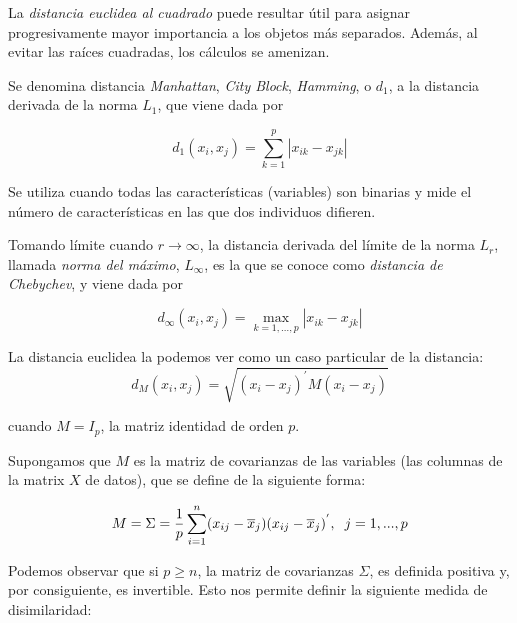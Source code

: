\begin{observacion}
La \textit{distancia euclidea al cuadrado} puede resultar útil para asignar progresivamente mayor importancia a los objetos más separados. Además, al evitar las
raíces cuadradas, los cálculos se amenizan.
\end{observacion}


\begin{definicion}

    Se denomina distancia \textit{Manhattan}, \textit{City Block}, \textit{Hamming}, o \textit{$d_{1}$}, a la distancia derivada de la norma $L_{1}$, que viene dada por
    
    \[
    d_{1}(x_{i},x_{j}) = \sum_{k=1}^{p} |x_{ik}-x_{jk}|
    \]
    
\end{definicion}

Se utiliza cuando todas las características (variables) son binarias y mide el número de características en las que dos individuos difieren.

\begin{definicion}  %
    
    Tomando límite cuando $r \rightarrow \infty$, la distancia derivada del límite de la norma $L_{r}$, llamada \textit{norma del máximo}, $L_{\infty}$, es la que se conoce
    como \textit{distancia de Chebychev}, y viene dada por

    \[
    d_{\infty}(x_{i},x_{j}) = \max_{k=1,\dots,p} |x_{ik}-x_{jk}|
    \]
\end{definicion}

\begin{observacion}
    La distancia euclidea la podemos ver como un caso particular de la distancia:
    \[
    d_{M}(x_{i},x_{j}) = \sqrt{(x_{i}-x_{j})^{'}M(x_{i}-x_{j})}
    \]

    cuando $M=I_{p}$, la matriz identidad de orden $p$.
\end{observacion}

Supongamos que $M$ es la matriz de covarianzas de las variables (las columnas de la matrix $X$ de datos), que se define de la siguiente forma:

\[
M=\Sigma = \frac{1}{p} \sum_{i=1}^{n}(x_{ij}-\overline{x}_{j})(x_{ij}-\overline{x}_{j})^{'}, \hspace{0.2cm} j=1,...,p 
\]

Podemos observar que si $p \geq n$, la matriz de covarianzas $\Sigma$, es definida positiva y, por consiguiente, es invertible. Esto nos permite 
definir la siguiente medida de disimilaridad:

